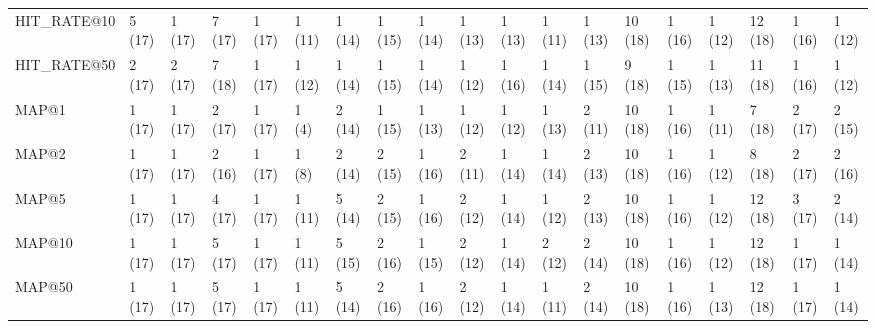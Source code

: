 \begin{tabular}{lllllllllllllllllll}
HIT\_RATE@10  &       5 (17) &             1 (17) &        7 (17) &          1 (17) &    1 (11) &                            1 (14) &                         1 (15) &                             1 (14) &         1 (13) &             1 (13) &             1 (11) &             1 (13) &  10 (18) &                    1 (16) &          1 (12) &  12 (18) &  1 (16) &    1 (12) \\
HIT\_RATE@50  &       2 (17) &             2 (17) &        7 (18) &          1 (17) &    1 (12) &                            1 (14) &                         1 (15) &                             1 (14) &         1 (12) &             1 (16) &             1 (14) &             1 (15) &   9 (18) &                    1 (15) &          1 (13) &  11 (18) &  1 (16) &    1 (12) \\
MAP@1        &       1 (17) &             1 (17) &        2 (17) &          1 (17) &     1 (4) &                            2 (14) &                         1 (15) &                             1 (13) &         1 (12) &             1 (12) &             1 (13) &             2 (11) &  10 (18) &                    1 (16) &          1 (11) &   7 (18) &  2 (17) &    2 (15) \\
MAP@2        &       1 (17) &             1 (17) &        2 (16) &          1 (17) &     1 (8) &                            2 (14) &                         2 (15) &                             1 (16) &         2 (11) &             1 (14) &             1 (14) &             2 (13) &  10 (18) &                    1 (16) &          1 (12) &   8 (18) &  2 (17) &    2 (16) \\
MAP@5        &       1 (17) &             1 (17) &        4 (17) &          1 (17) &    1 (11) &                            5 (14) &                         2 (15) &                             1 (16) &         2 (12) &             1 (14) &             1 (12) &             2 (13) &  10 (18) &                    1 (16) &          1 (12) &  12 (18) &  3 (17) &    2 (14) \\
MAP@10       &       1 (17) &             1 (17) &        5 (17) &          1 (17) &    1 (11) &                            5 (15) &                         2 (16) &                             1 (15) &         2 (12) &             1 (14) &             2 (12) &             2 (14) &  10 (18) &                    1 (16) &          1 (12) &  12 (18) &  1 (17) &    1 (14) \\
MAP@50       &       1 (17) &             1 (17) &        5 (17) &          1 (17) &    1 (11) &                            5 (14) &                         2 (16) &                             1 (16) &         2 (12) &             1 (14) &             1 (11) &             2 (14) &  10 (18) &                    1 (16) &          1 (13) &  12 (18) &  1 (17) &    1 (14) \\

\end{tabular}
